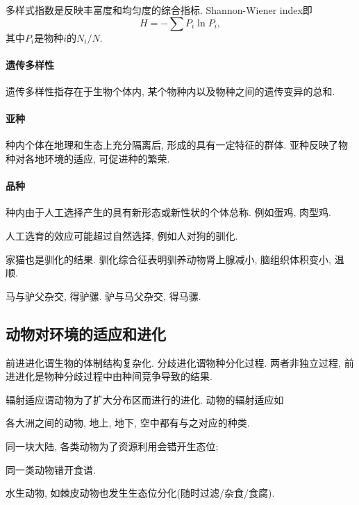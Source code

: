 \documentclass{ctexart}
\begin{document}

多样式指数是反映丰富度和均匀度的综合指标. Shannon-Wiener index即
\[ H = -\sum P_i \ln P_i, \]
其中$P_i$是物种$i$的$N_i / N$.

\paragraph{遗传多样性} %
\label{par:遗传多样性}

遗传多样性指存在于生物个体内, 某个物种内以及物种之间的遗传变异的总和.


\paragraph{亚种} %
\label{par:亚种}

种内个体在地理和生态上充分隔离后, 形成的具有一定特征的群体. 亚种反映了物种对各地环境的适应, 可促进种的繁荣.


\paragraph{品种} %
\label{par:品种}

种内由于人工选择产生的具有新形态或新性状的个体总称. 例如蛋鸡, 肉型鸡.


\begin{remark}
    人工选育的效应可能超过自然选择, 例如人对狗的驯化.
\end{remark}
\begin{ex}
    家猫也是驯化的结果. 驯化综合征表明驯养动物肾上腺减小, 脑组织体积变小, 温顺.
\end{ex}
\begin{ex}
    马与驴父杂交, 得驴骡. 驴与马父杂交, 得马骡.
\end{ex}


\subsection{动物对环境的适应和进化} %
\label{sub:动物对环境的适应和进化}

前进进化谓生物的体制结构复杂化. 分歧进化谓物种分化过程. 两者非独立过程, 前进进化是物种分歧过程中由种间竞争导致的结果. 
\par
辐射适应谓动物为了扩大分布区而进行的进化. 动物的辐射适应如
\begin{cenum}
    \item 各大洲之间的动物, 地上, 地下, 空中都有与之对应的种类.
    \item 同一块大陆, 各类动物为了资源利用会错开生态位;
    \item 同一类动物错开食谱.
\end{cenum}
水生动物, 如棘皮动物也发生生态位分化(随时过滤/杂食/食腐).
\end{document}

